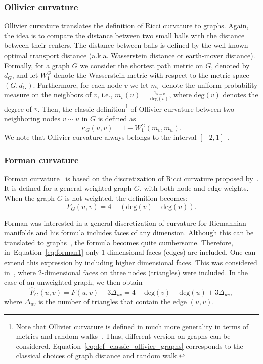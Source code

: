 \documentclass[runningheads]{llncs}
\begin{document}
\subsubsection{Ollivier curvature}

Ollivier curvature translates the definition of Ricci curvature to graphs. Again, the idea is to compare the distance between two small balls with the distance between their centers. The distance between balls is defined by the well-known optimal transport distance (a.k.a. Wasserstein distance or earth-mover distance).
Formally, for a graph $G$ we consider the shortest path metric on $G$, denoted by $d_G$, and let $W_1^G$ denote the Wasserstein metric with respect to the metric space $(G,d_G)$. Furthermore, for each node $v$ we let $m_v$ denote the uniform probability measure on the neighbors of $v$, i.e., $m_v(u) = \frac{1_{u \sim v}}{\mathrm{deg}(v)}$, where $\mathrm{deg}(v)$ denotes the degree of $v$. Then, the classic definition\footnote{Note that Ollivier curvature is defined in much more generality in terms of metrics and random walks~\cite{ollivier2009ricci}. Thus, different version on graphs can be considered. Equation~\eqref{eq:def_classic_ollivier_graphs} corresponds to the classical choices of graph distance and random walk.} of Ollivier curvature between two neighboring nodes $v \sim u$ in $G$ is defined as
\begin{equation}\label{eq:def_classic_ollivier_graphs}
	\kappa_G(u,v) = 1 - W_1^G(m_v, m_u).
\end{equation}
We note that Ollivier curvature always belongs to the interval $[-2,1]$~\cite{jost2014ollivier}.

\subsubsection{Forman curvature}

Forman curvature~\cite{sreejith2016forman} is based on the discretization of Ricci curvature proposed by~\cite{forman2003bochner}. It is defined for a general weighted graph $G$, with both node and edge weights. 
When the graph $G$ is not weighted, 
the definition becomes:
\begin{equation}\label{eq:forman1}
F_G(u,v) 
= 4 - (\mathrm{deg}(v) + \mathrm{deg}(u)).
\end{equation}

Forman was interested in a general discretization of curvature for Riemannian manifolds and his formula includes faces of any dimension. Although this can be translated to graphs~\cite{weber2017coarse}, the formula becomes quite cumbersome. Therefore, in~Equation~\ref{eq:forman1} only $1$-dimensional faces (edges) are included. One can extend this expression by including higher dimensional faces. This was considered in~\cite{samal2018comparative}, where $2$-dimensional faces on three nodes (triangles) were included. In the case of an unweighted graph, we then obtain
\begin{equation}\label{eq:forman2}
	\hat F_G(u,v) = F(u,v) + 3\Delta_{uv} 
	= 4 - \mathrm{deg}(v) - \mathrm{deg}(u) + 3\Delta_{uv},
\end{equation}
where $\Delta_{uv}$ is the number of triangles that contain the edge $(u,v)$. 
\end{document}
